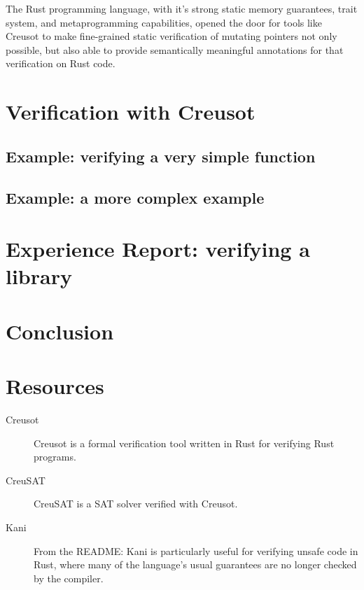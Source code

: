 \documentclass[12pt]{article}
\begin{document}
The Rust programming language, with it's strong static memory guarantees, trait system, and metaprogramming capabilities, 
opened the door for tools like Creusot to make fine-grained static verification of mutating pointers not only possible, but also able to provide 
semantically meaningful annotations for that verification on Rust code.   

\section{Verification with Creusot}

\subsection{Example: verifying a very simple function}

\subsection{Example: a more complex example}

\section{Experience Report: verifying a library} %

\section{Conclusion}


\section{Resources}

\begin{description}
  \item[Creusot] \cite{denisCreusot2023} \cite{denisCreusotFoundryDeductive2022}

    Creusot is a formal verification tool written in Rust for verifying Rust programs.
    
  \item[CreuSAT] \cite{skotamCreuSAT2023}

    CreuSAT is a SAT solver verified with Creusot.
    
  \item[Kani] \cite{Kani2023}

    From the README: Kani is particularly useful for verifying unsafe code in
    Rust, where many of the language's usual guarantees are no longer checked by
    the compiler.

\end{description}

\printbibliography
\end{document}
